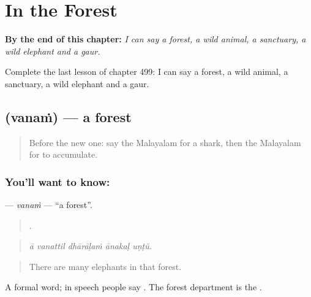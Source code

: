 
\chapter{In the Forest}
\label{ch:ml-in-the-forest}

\begin{chapteropening}
\textbf{By the end of this chapter:} \emph{I can say a forest, a wild animal, a sanctuary, a wild elephant and a gaur.}

Complete the last lesson of chapter 499: I can say a forest, a wild animal, a sanctuary, a wild elephant and a gaur.
\end{chapteropening}

\section[\texorpdfstring{\ml{വനം} (vanaṁ)}{വനം (vanaṁ)}]{ (vanaṁ) — a forest}

\label{lesson:ML-C499-vanam}



\begin{quote}
Before the new one: say the Malayalam for a shark, then the Malayalam for to accumulate.
\end{quote}

\subsection*{You'll want to know: }
\textbf{} — \emph{vanaṁ} — \textquotedblleft{}a forest\textquotedblright{}.

\begin{quote}
    .
\end{quote}

\begin{quote}
\emph{ā vanattil dhārāḷaṁ ānakaḷ uṇṭŭ.}
\end{quote}

\begin{quote}
There are many elephants in that forest.
\end{quote}

A formal word; in speech people say . The forest department is the .

